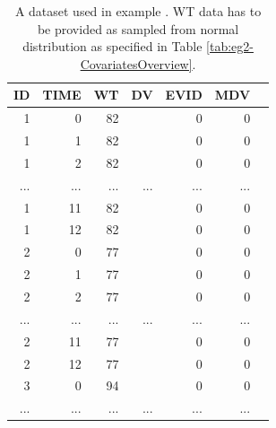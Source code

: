 \begin{table}[htdp]
\begin{center}
\small
\begin{tabular}{rrrrrrr}\toprule
ID	& TIME 	& WT	& DV		& EVID	& MDV \\\midrule
1	& 0		& 82		& 		& 0		& 0	\\
1	& 1		& 82		& 		& 0		& 0	\\
1	& 2		& 82		& 		& 0		& 0	\\
...	& ...		& ...		& ...		& ...		& ...	\\
1	& 11		& 82		& 		& 0		& 0	\\
1	& 12		& 82		& 		& 0		& 0	\\
2	& 0		& 77		& 		& 0		& 0	\\
2	& 1		& 77		& 		& 0		& 0	\\
2	& 2		& 77		& 		& 0		& 0	\\
...	& ...		& ...		& ...		& ...		& ...	\\
2	& 11		& 77		& 		& 0		& 0	\\
2	& 12		& 77		& 		& 0		& 0	\\
3	& 0		& 94		& 		& 0		& 0	\\
...	& ...		& ...		&...		& ...		& ...	\\ \bottomrule
\end{tabular}
\end{center}
\caption{A dataset used in example \theexamples. WT data has to be provided 
as sampled from normal distribution as specified in Table \ref{tab:eg2-CovariatesOverview}.}
\label{tab:example2_dataSet}
\end{table}%
\lstset{language=XML}
